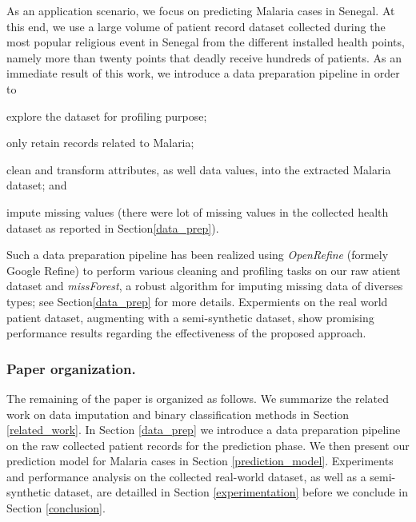 As an application scenario, we focus on predicting Malaria cases in Senegal. At this end, we use  a large volume of patient record dataset collected during the most popular religious event in Senegal from the different installed health points, namely more than twenty points that deadly receive hundreds of patients.
As an immediate result of this work, we introduce a data preparation pipeline in order to 
\begin{inparaenum}[(i)]
\item explore the dataset for profiling purpose;
\item only retain records related to Malaria;
\item clean and transform attributes, as well data values, into the extracted Malaria dataset; and 
\item impute missing values (there were lot of missing values in the collected health dataset as reported in Section\ref{data_prep}).
\end{inparaenum}
Such a data preparation pipeline has been realized using \emph{OpenRefine} (formely Google Refine) to perform various cleaning and profiling tasks on our raw atient dataset and \emph{missForest}, a robust
 algorithm for imputing  missing data of diverses types; see Section\ref{data_prep} for more details. 
Expermients on the real world patient dataset, augmenting with a semi-synthetic dataset, show promising performance results regarding the effectiveness of the proposed approach.

\subsubsection{Paper organization.}The remaining of the paper is organized as follows. We summarize the related work on data imputation and binary classification methods in Section \ref{related_work}.
In Section \ref{data_prep} we introduce a data preparation pipeline on the raw collected patient records for the prediction phase. 
We then present our prediction model for Malaria cases in Section \ref{prediction_model}.
Experiments and performance analysis  on the collected real-world dataset, as well as a semi-synthetic dataset,  are detailled in Section \ref{experimentation} before we conclude in Section \ref{conclusion}. 
